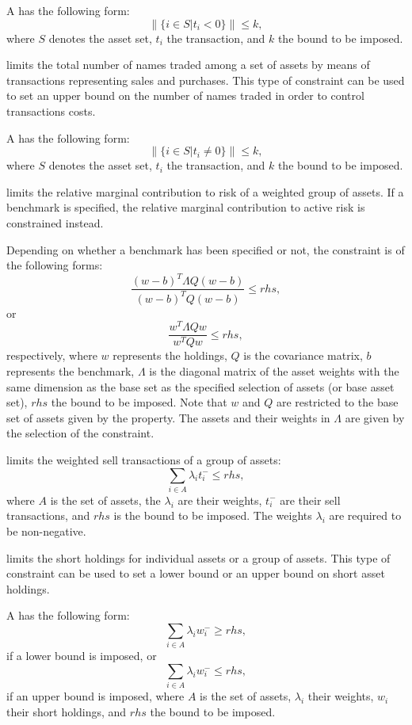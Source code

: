    A  has the following form: 
   \[
        \|\{i\in S|t_i < 0\}\| \le k,
   \]
   where $S$ denotes the asset set, $t_i$ the transaction, and $k$ the bound to be imposed. 

   limits the total number of names traded among a set of assets by means of transactions representing sales and purchases. 
   This type of constraint can be used to set an upper bound on the number of names traded in order to control transactions costs. 

   A  has the following form: 
   \[
        \|\{i\in S|t_i \neq 0\}\| \le k,
   \]
   where $S$ denotes the asset set, $t_i$ the transaction, and $k$ the bound to be imposed. 

   limits the relative marginal contribution to risk of a weighted group of assets. 
   If a benchmark is specified, the relative marginal contribution to active risk is constrained instead. 

   Depending on whether a benchmark has been specified or not, 
   the constraint is of the following forms: 
   \[
       \frac{(w-b)^T\Lambda Q (w-b)}{(w-b)^T Q (w-b)} \le rhs,
   \]
   or
   \[
       \frac{w^T\Lambda Q w}{w^T Q w} \le rhs,
   \]
   respectively, where $w$ represents the holdings, 
   $Q$ is the covariance matrix, $b$ represents the benchmark, 
   $\Lambda$ is the diagonal matrix of the asset weights with the same dimension as the 
   base set as the specified selection of assets (or base asset set),
   $rhs$ the bound to be imposed.
   Note that $w$ and $Q$ are restricted to the base set of assets given by the  property. 
   The assets and their weights in $\Lambda$ are given by the selection of the constraint. 

   limits the weighted sell transactions of a group of assets:
   \[
      \sum_{i\in A}\lambda_i t_i^- \le rhs,
   \]
   where $A$ is the set of assets, the $\lambda_i$ are their weights, 
   $t_i^-$ are their sell transactions, and $rhs$ is the bound to be imposed. 
   The weights $\lambda_i$ are required to be non-negative.    

   limits the short holdings for individual assets or a group of assets. 
   This type of constraint can be used to set a lower bound or an upper bound on short asset holdings. 

   A  has the following form: 
   \[
      \sum_{i\in A}\lambda_i w_i^- \ge rhs,
   \]
   if a lower bound is imposed, or
   \[
      \sum_{i\in A}\lambda_i w_i^- \le rhs,
   \]
   if an upper bound is imposed, where $A$ is the set of assets, 
   $\lambda_i$ their weights, $w_i$ their short holdings, and $rhs$ the bound to be imposed.

